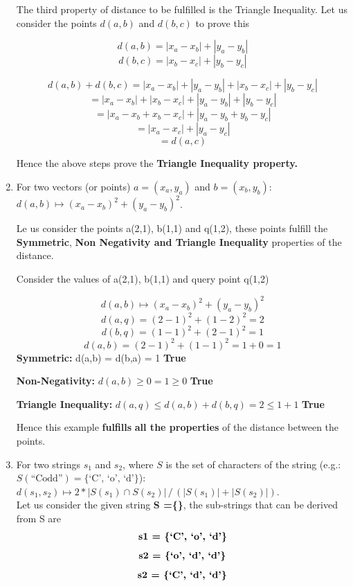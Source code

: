 \begin{enumerate}
    The third property of distance to be fulfilled is the Triangle Inequality. Let us consider the points $d(a,b)$ and $d(b,c)$ to prove this

    \[d(a, b) = | x_a - x_b | + | y_a - y_b |\]
    \[d(b, c) = | x_b - x_c | + | y_b - y_c | \]
    
    \[d(a,b) + d(b,c) = | x_a - x_b | + | y_a - y_b | + | x_b - x_c | + | y_b - y_c | \]
    \quad  \[ = | x_a - x_b | + | x_b - x_c | + | y_a - y_b | + | y_b - y_c | \]
    \quad \[= |x_a - x_b + x_b - x_c| + | y_a - y_b + y_b - y_c | \]
    \quad \[=|x_a - x_c| + |y_a - y_c |\]
    \quad \[=d(a,c)\]

    Hence the above steps prove the \textbf{Triangle Inequality property.}
    
    
    
    \item\label{l2} 
    For two vectors (or points) $a=(x_a, y_a)$ and $b=(x_b, y_b)$:
    $d(a, b) \mapsto ( x_a - x_b )^2 + ( y_a - y_b )^2$.

    Le us consider the points a(2,1), b(1,1) and q(1,2), these points fulfill the \textbf{Symmetric}, \textbf{Non Negativity and Triangle Inequality} properties of the distance.

    Consider the values of a(2,1), b(1,1) and query point q(1,2)

    \[d(a, b) \mapsto ( x_a - x_b )^2 + ( y_a - y_b )^2\]
    \quad \[d(a,q) = (2-1)^2 + (1-2)^2 = 2\]
    \quad \[d(b,q) = (1-1)^2 + (2-1)^2 = 1\]
    \quad \[d(a,b) = (2-1)^2 + (1-1)^2 = 1+0 = 1\]
    \textbf{Symmetric:} d(a,b) = d(b,a) = 1 \textbf{True}
    
    \textbf{Non-Negativity:} $d(a,b) \geq 0 =  1 \geq 0$ \textbf{ True}

    \textbf{Triangle Inequality:} $d(a,q) \leq d(a,b) + d(b,q) = 2 \leq 1+1$ \textbf{True}

    Hence this example \textbf{fulfills} \textbf{all the properties} of the distance between the points.

 
      \item\label{l3} 
      For two strings $s_1$ and $s_2$, where $S$ is the set of characters of the string (e.g.: $S(\text{``Codd''}) = \{\text{`C', `o', `d'}\}$):
      $d(s_1, s_2) \mapsto 2* |S(s_1) \cap S(s_2)| \, / \, (|S(s_1)| + |S(s_2)|)$.\\

      Let us consider the given string \textbf{S =\{\}}, the sub-strings that can be derived from S are
      \[\textbf{s1 = \{\text{`C', `o', `d'}\}}\]
      \[\textbf{s2 = \{\text{`o', `d', `d'}\}}\]
      \[\textbf{s2 = \{\text{`C', `d', `d'}\}}\]


\end{enumerate}
